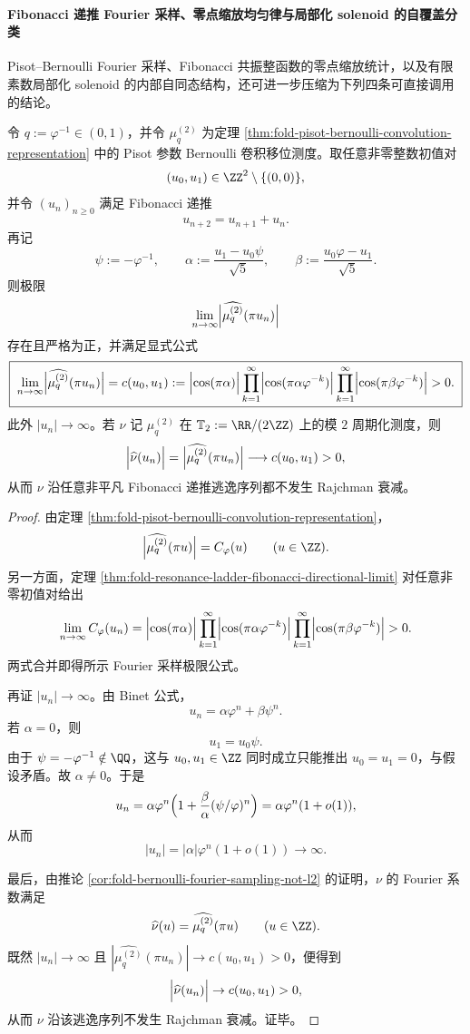 \paragraph{Fibonacci 递推 Fourier 采样、零点缩放均匀律与局部化 solenoid 的自覆盖分类}
Pisot--Bernoulli Fourier 采样、Fibonacci 共振整函数的零点缩放统计，以及有限素数局部化 solenoid 的内部自同态结构，还可进一步压缩为下列四条可直接调用的结论。

\begin{theorem}\label{thm:xi-pisot-bernoulli-fibonacci-direction-nonrajchman}
令 \(q:=\varphi^{-1}\in(0,1)\)，并令 \(\mu_q^{(2)}\) 为定理 \ref{thm:fold-pisot-bernoulli-convolution-representation} 中的 Pisot 参数 Bernoulli 卷积移位测度。取任意非零整数初值对
\[
(u_0,u_1)\in \ZZ^2\setminus\{(0,0)\},
\]
并令 \((u_n)_{n\ge 0}\) 满足 Fibonacci 递推
\[
u_{n+2}=u_{n+1}+u_n.
\]
再记
\[
\psi:=-\varphi^{-1},\qquad
\alpha:=\frac{u_1-u_0\psi}{\sqrt5},\qquad
\beta:=\frac{u_0\varphi-u_1}{\sqrt5}.
\]
则极限
\[
\lim_{n\to\infty}\Bigl|\widehat{\mu_q^{(2)}}(\pi u_n)\Bigr|
\]
存在且严格为正，并满足显式公式
\[
\boxed{\;
\lim_{n\to\infty}\Bigl|\widehat{\mu_q^{(2)}}(\pi u_n)\Bigr|
=
c(u_0,u_1)
:=
\Bigl|\cos(\pi\alpha)\Bigr|
\prod_{k=1}^{\infty}\Bigl|\cos(\pi\alpha\varphi^{-k})\Bigr|
\prod_{k=1}^{\infty}
\Bigl|\cos(\pi\beta\varphi^{-k})\Bigr|
>0.
\;}
\]
此外 \(|u_n|\to\infty\)。若 \(\nu\) 记 \(\mu_q^{(2)}\) 在 \(\mathbb T_2:=\RR/(2\ZZ)\) 上的模 \(2\) 周期化测度，则
\[
\Bigl|\widehat{\nu}(u_n)\Bigr|
=
\Bigl|\widehat{\mu_q^{(2)}}(\pi u_n)\Bigr|
\longrightarrow c(u_0,u_1)>0,
\]
从而 \(\nu\) 沿任意非平凡 Fibonacci 递推逃逸序列都不发生 Rajchman 衰减。
\end{theorem}
\begin{proof}
由定理 \ref{thm:fold-pisot-bernoulli-convolution-representation}，
\[
\Bigl|\widehat{\mu_q^{(2)}}(\pi u)\Bigr|=C_\varphi(u)
\qquad(u\in\ZZ).
\]
另一方面，定理 \ref{thm:fold-resonance-ladder-fibonacci-directional-limit} 对任意非零初值对给出
\[
\lim_{n\to\infty}C_\varphi(u_n)
=
\Bigl|\cos(\pi\alpha)\Bigr|
\prod_{k=1}^{\infty}\Bigl|\cos(\pi\alpha\varphi^{-k})\Bigr|
\prod_{k=1}^{\infty}
\Bigl|\cos(\pi\beta\varphi^{-k})\Bigr|
>0.
\]
两式合并即得所示 Fourier 采样极限公式。

再证 \(|u_n|\to\infty\)。由 Binet 公式，
\[
u_n=\alpha\varphi^n+\beta\psi^n.
\]
若 \(\alpha=0\)，则
\[
u_1=u_0\psi.
\]
由于 \(\psi=-\varphi^{-1}\notin \QQ\)，这与 \(u_0,u_1\in\ZZ\) 同时成立只能推出 \(u_0=u_1=0\)，与假设矛盾。故 \(\alpha\neq 0\)。于是
\[
u_n=\alpha\varphi^n\Bigl(1+\frac{\beta}{\alpha}(\psi/\varphi)^n\Bigr)
=
\alpha\varphi^n(1+o(1)),
\]
从而
\[
|u_n|=|\alpha|\varphi^n(1+o(1))\to\infty.
\]

最后，由推论 \ref{cor:fold-bernoulli-fourier-sampling-not-l2} 的证明，\(\nu\) 的 Fourier 系数满足
\[
\widehat{\nu}(u)=\widehat{\mu_q^{(2)}}(\pi u)
\qquad(u\in\ZZ).
\]
既然 \(|u_n|\to\infty\) 且 \(|\widehat{\mu_q^{(2)}}(\pi u_n)|\to c(u_0,u_1)>0\)，便得到
\[
\Bigl|\widehat{\nu}(u_n)\Bigr|\to c(u_0,u_1)>0,
\]
从而 \(\nu\) 沿该逃逸序列不发生 Rajchman 衰减。证毕。
\end{proof}

